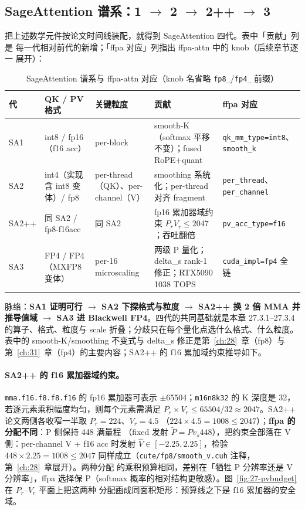 \subsection{SageAttention 谱系：1 $\to$ 2 $\to$ 2++ $\to$ 3}

把上述数学元件按论文时间线装配，就得到 SageAttention 四代。表中「贡献」列是
每一代相对前代的新增；「ffpa 对应」列指出 ffpa-attn 中的 knob（后续章节逐一
展开）：

\begin{table}[htbp]
  \centering
  \caption{SageAttention 谱系与 ffpa-attn 对应（knob 名省略 \texttt{fp8\_}/\texttt{fp4\_} 前缀）}
  \label{tab:27-sage}
  \begin{tabular}{p{1.2cm}p{2.1cm}p{2.5cm}p{3.2cm}p{2.9cm}}
    \toprule
    代 & QK / PV 格式 & 关键粒度 & 贡献 & ffpa 对应 \\
    \midrule
    SA1 & int8 / fp16（f16 acc） & per-block & smooth-K（softmax 平移不变）；fused RoPE+quant & {\footnotesize\texttt{qk\_mm\_type=int8}}、{\footnotesize\texttt{smooth\_k}} \\
    SA2 & int4（实现含 int8 变体）/ fp8 & per-thread（QK）、per-channel（V） & smoothing 系统化；per-thread 对齐 fragment & {\footnotesize\texttt{per\_thread}}、{\footnotesize\texttt{per\_channel}} \\
    SA2++ & 同 SA2 / fp8-f16acc & 同 SA2 & fp16 累加器域约束 $P_r V_r \le 2047$；吞吐翻倍 & {\footnotesize\texttt{pv\_acc\_type=f16}} \\
    SA3 & FP4 / FP4（MXFP8 变体） & per-16 microscaling & 两级 P 量化；delta\_s rank-1 修正；RTX5090 1038 TOPS & {\footnotesize\texttt{cuda\_impl=fp4}} 全链 \\
    \bottomrule
  \end{tabular}
\end{table}

脉络：\textbf{SA1 证明可行 $\to$ SA2 下探格式与粒度 $\to$ SA2++ 换 2 倍
MMA 并推导值域 $\to$ SA3 进 Blackwell FP4}。四代的共同基础就是本章 27.3.1--27.3.4
的算子、格式、粒度与 scale 折叠；分歧只在每个量化点选什么格式、什么粒度。表中的
smooth-K/smoothing 不变式与 delta\_s 修正是第~\ref{ch:28}~章（fp8）与
第~\ref{ch:31}~章（fp4）的主要内容；SA2++ 的 f16 累加域约束推导如下。

\paragraph{SA2++ 的 f16 累加器域约束。}
\texttt{mma.f16.f8.f8.f16} 的 fp16 累加器可表示 $\pm 65504$；\texttt{m16n8k32} 的
K 深度是 32，若逐元素乘积幅度均匀，则每个元素需满足 $P_r \times V_r \le
65504/32 \approx 2047$。SA2++ 论文两侧各收窄一半取 $P_r = 224$、$V_r = 4.5$
（$224 \times 4.5 = 1008 \le 2047$）；\textbf{ffpa 的分配不同}：P 侧保持 448 满量程
（fixed 发射 $\tilde{P} = P v_s 448$），把约束全部落在 V 侧：per-channel V +
f16 acc 时发射 $\hat{V} \in [-2.25, 2.25]$，检验 $448 \times 2.25 = 1008 \le 2047$
同样成立（\texttt{cute/fp8/smooth\_v.cuh} 注释，第~\ref{ch:28}~章展开）。两种分配
的乘积预算相同，差别在「牺牲 P 分辨率还是 V 分辨率」，ffpa 选择保 P（softmax
概率的相对结构更敏感）。图~\ref{fig:27-pvbudget} 在 $P_r$--$V_r$ 平面上把这两种
分配画成同面积矩形：预算线之下是 f16 累加器的安全域。

